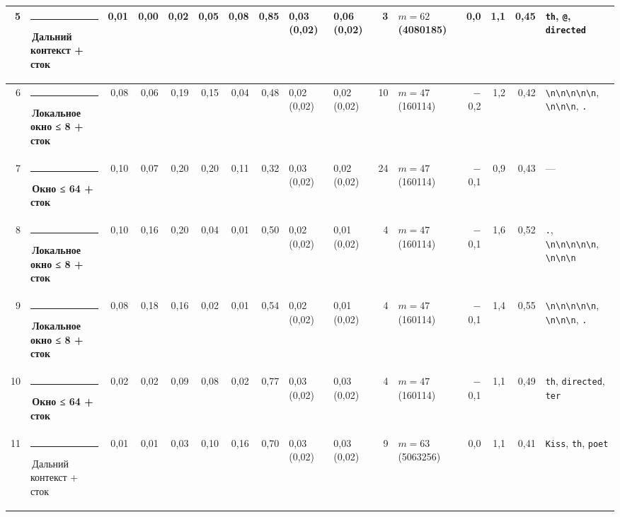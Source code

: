 \documentclass[10pt]{article}
\begin{document}
\begin{minipage}{\linewidth}
\begin{center}
{\begin{tabular}{|r|l|r|r|r|r|r|r|l|l|r|l|r|r|r|l|}
5 & \textcolor[HTML]{C3C2B7}{\rule{0.62em}{0.62em}}\,Дальний контекст + сток & 0,01 & 0,00 & 0,02 & 0,05 & 0,08 & 0,85 & 0,03 (0,02) & 0,06 (0,02) & 3 & $m{=}62$ (4080185) & 0,0 & 1,1 & 0,45 & \texttt{th}, \texttt{\textvisiblespace{}@}, \texttt{\textvisiblespace{}directed} \\ \hline
6 & \textcolor[HTML]{1BAF7A}{\rule{0.62em}{0.62em}}\,\textbf{Локальное окно ≤ 8 + сток} & 0,08 & 0,06 & 0,19 & 0,15 & 0,04 & 0,48 & 0,02 (0,02) & 0,02 (0,02) & 10 & $m{=}47$ (160114) & $-$0,2 & 1,2 & 0,42 & \texttt{\textvisiblespace{}\textbackslash{}n\textbackslash{}n\textbackslash{}n\textbackslash{}n\textbackslash{}n}, \texttt{\textvisiblespace{}\textbackslash{}n\textbackslash{}n\textbackslash{}n}, \texttt{\textvisiblespace{}.} \\ \hline
7 & \textcolor[HTML]{EDA100}{\rule{0.62em}{0.62em}}\,\textbf{Окно ≤ 64 + сток} & 0,10 & 0,07 & 0,20 & 0,20 & 0,11 & 0,32 & 0,03 (0,02) & 0,02 (0,02) & 24 & $m{=}47$ (160114) & $-$0,1 & 0,9 & 0,43 & — \\ \hline
8 & \textcolor[HTML]{1BAF7A}{\rule{0.62em}{0.62em}}\,\textbf{Локальное окно ≤ 8 + сток} & 0,10 & 0,16 & 0,20 & 0,04 & 0,01 & 0,50 & 0,02 (0,02) & 0,01 (0,02) & 4 & $m{=}47$ (160114) & $-$0,1 & 1,6 & 0,52 & \texttt{\textvisiblespace{}.}, \texttt{\textvisiblespace{}\textbackslash{}n\textbackslash{}n\textbackslash{}n\textbackslash{}n\textbackslash{}n}, \texttt{\textvisiblespace{}\textbackslash{}n\textbackslash{}n\textbackslash{}n} \\ \hline
9 & \textcolor[HTML]{1BAF7A}{\rule{0.62em}{0.62em}}\,\textbf{Локальное окно ≤ 8 + сток} & 0,08 & 0,18 & 0,16 & 0,02 & 0,01 & 0,54 & 0,02 (0,02) & 0,01 (0,02) & 4 & $m{=}47$ (160114) & $-$0,1 & 1,4 & 0,55 & \texttt{\textvisiblespace{}\textbackslash{}n\textbackslash{}n\textbackslash{}n\textbackslash{}n\textbackslash{}n}, \texttt{\textvisiblespace{}\textbackslash{}n\textbackslash{}n\textbackslash{}n}, \texttt{\textvisiblespace{}.} \\ \hline
10 & \textcolor[HTML]{EDA100}{\rule{0.62em}{0.62em}}\,\textbf{Окно ≤ 64 + сток} & 0,02 & 0,02 & 0,09 & 0,08 & 0,02 & 0,77 & 0,03 (0,02) & 0,03 (0,02) & 4 & $m{=}47$ (160114) & $-$0,1 & 1,1 & 0,49 & \texttt{th}, \texttt{\textvisiblespace{}directed}, \texttt{ter} \\ \hline
11 & \textcolor[HTML]{C3C2B7}{\rule{0.62em}{0.62em}}\,Дальний контекст + сток & 0,01 & 0,01 & 0,03 & 0,10 & 0,16 & 0,70 & 0,03 (0,02) & 0,03 (0,02) & 9 & $m{=}63$ (5063256) & 0,0 & 1,1 & 0,41 & \texttt{\textvisiblespace{}Kiss}, \texttt{th}, \texttt{\textvisiblespace{}poet} \\ \hline

\end{tabular}}
\end{center}
\end{minipage}
\end{document}
